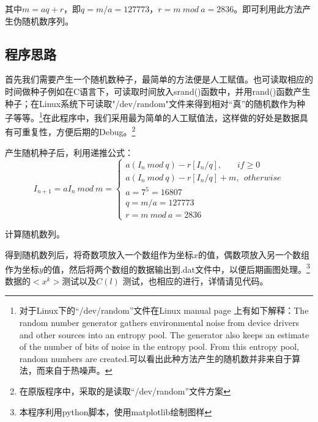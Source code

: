 \documentclass[a4paper,11pt]{article}
\begin{document}
其中$m=aq+r$，即$q=m/a=127773$，$r=m \ mod \ a=2836$。即可利用此方法产生伪随机数序列。

\subsection{程序思路}
首先我们需要产生一个随机数种子，最简单的方法便是人工赋值。也可读取相应的时间做种子例如在C语言下，可读取时间放入srand()函数中，并用rand()函数产生种子；在Linux系统下可读取"/dev/random"文件来得到相对“真”的随机数作为种子等等。\footnote{对于Linux下的“/dev/random”文件在Linux manual page 上有如下解释：The random number generator gathers environmental noise from device
       drivers and other sources into an entropy pool.  The generator also
       keeps an estimate of the number of bits of noise in the entropy pool.
       From this entropy pool, random numbers are created.可以看出此种方法产生的随机数并非来自于算法，而来自于热噪声。}在此程序中，我们采用最为简单的人工赋值法，这样做的好处是数据具有可重复性，方便后期的Debug。\footnote{在原版程序中，采取的是读取“/dev/random”文件方案}

产生随机种子后，利用递推公式：
\begin{equation}
	I_{n+1} = aI_{n}  \ mod \ m = \left\{
	\begin{array}{l}
	a(I_{n}\ mod \ q) - r[I_{n}/q],\ \ \ \ \ \ \ \ if \geq 0 \\
		a(I_{n}\ mod \ q) - r[I_{n}/q] + m,\ \ otherwise	 \\
		a= 7^{5} =16807 \\
		q=m/a=127773\\
		r=m \ mod \ a=2836
	\end{array} 
	\right.
\end{equation}

计算随机数列。

得到随机数列后，将奇数项放入一个数组作为坐标$x$的值，偶数项放入另一个数组作为坐标$y$的值，然后将两个数组的数据输出到.dat文件中，以便后期画图处理。\footnote{本程序利用python脚本，使用matplotlib绘制图样}数据的$<x^{k}>$测试以及$C(l)$ 测试，也相应的进行，详情请见代码。
\end{document}
